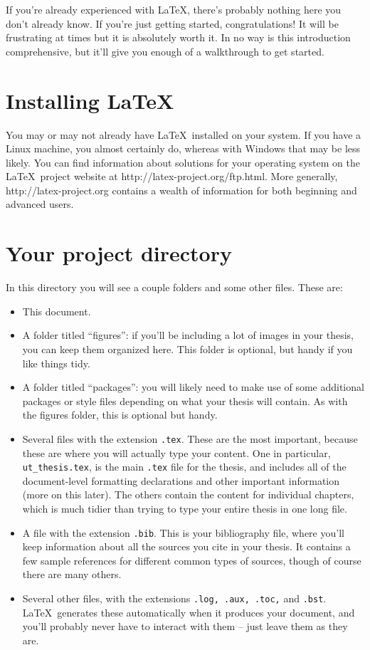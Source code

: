 If you're already experienced with \LaTeX, there's probably
nothing here you don't
already know. If you're just getting started, congratulations! It will be
frustrating at times but it is absolutely worth it. In no way is this 
introduction comprehensive,  but it'll give you enough
of a walkthrough to get started.

\section{Installing \LaTeX}
You may or may not already have \LaTeX ~installed on your system. If you have
a Linux machine, you almost certainly do, whereas with Windows that may be 
less likely. You can find information about solutions for your operating system
on the \LaTeX ~project website at http://latex-project.org/ftp.html.
More generally, http://latex-project.org contains a wealth of 
information for both beginning and advanced users.

\section{Your project directory}
In this directory you will see a couple folders and some other files. These are:

\begin{itemize}
  \item This document.
  \item A folder titled ``figures'': if you'll be including a lot of images
    in your thesis, you can keep them organized here. This folder is optional,
    but handy if you like things tidy.
  \item A folder titled ``packages'': you will likely need to make use of 
    some additional packages or style files depending on what your thesis
    will contain. As with the figures folder, this is optional but handy.
  \item Several files with the extension {\tt .tex}. These are the most 
    important, because these are where you will actually type your content.
    One in particular, {\tt ut\_thesis.tex}, is the main {\tt .tex} file for the
    thesis, and includes all of the document-level formatting declarations and
    other important information (more on this later). The others contain the
    content for individual chapters, which is much tidier than trying
    to type your entire thesis in one long file.
  \item A file with the extension {\tt .bib}. This is your bibliography file,
    where you'll keep information about all the sources you cite in your thesis.
    It contains a few sample references for different common types of sources,
    though of course there are many others.
  \item Several other files, with the extensions {\tt .log, .aux, .toc,} and 
    {\tt .bst}. \LaTeX ~generates these automatically when it
    produces your document, and you'll probably never have to interact with
    them -- just leave them as they are.
\end{itemize}

